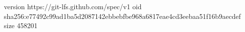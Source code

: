 version https://git-lfs.github.com/spec/v1
oid sha256:e77492c99ad1ba5d2087142ebbebfbe968a6817eae4cd3eebaa51f16b9aecdef
size 458201
